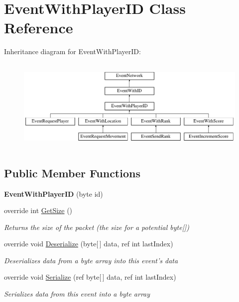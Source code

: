 \hypertarget{class_event_with_player_i_d}{\section{Event\-With\-Player\-I\-D Class Reference}
\label{class_event_with_player_i_d}
}
Inheritance diagram for Event\-With\-Player\-I\-D\-:\begin{figure}[H]
\begin{center}
\leavevmode
\includegraphics[height=4.545455cm]{class_event_with_player_i_d}
\end{center}
\end{figure}
\subsection*{Public Member Functions}
\begin{DoxyCompactItemize}
\item 
\hypertarget{class_event_with_player_i_d_a44a3302e35cd05c5501f6e6056be55ea}{{\bfseries Event\-With\-Player\-I\-D} (byte id)}\label{class_event_with_player_i_d_a44a3302e35cd05c5501f6e6056be55ea}

\item 
override int \hyperlink{class_event_with_player_i_d_a85e4b721aa1481d394d4c520d0103e74}{Get\-Size} ()
\begin{DoxyCompactList}\small\item\em Returns the size of the packet (the size for a potential byte\mbox{[}\mbox{]}) \end{DoxyCompactList}\item 
override void \hyperlink{class_event_with_player_i_d_a2492f5877e206df522bf181b10d2aeda}{Deserialize} (byte\mbox{[}$\,$\mbox{]} data, ref int last\-Index)
\begin{DoxyCompactList}\small\item\em Deserializes data from a byte array into this event's data \end{DoxyCompactList}\item 
override void \hyperlink{class_event_with_player_i_d_a3decca39195fe4e2fda1f8d57ca35a5f}{Serialize} (ref byte\mbox{[}$\,$\mbox{]} data, ref int last\-Index)
\begin{DoxyCompactList}\small\item\em Serializes data from this event into a byte array \end{DoxyCompactList}\end{DoxyCompactItemize}
